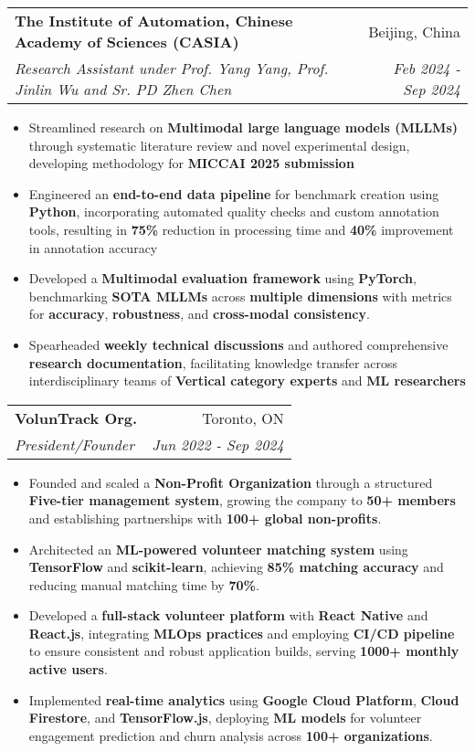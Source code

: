 \documentclass[letterpaper,10pt]{article}
\makeatletter
\newcommand{\resumeItem}[1]{
  \item\small{
    {#1 \vspace{-5pt}}
  }
}
\newcommand{\resumeSubheading}[4]{
  \vspace{-2pt}\item
    \begin{tabular*}{0.97\textwidth}[t]{l@{\extracolsep{\fill}}r}
      \textbf{#1} & #2 \\
      \textit{\small#3} & \textit{\small #4} \\
    \end{tabular*}\vspace{-7pt}
}
\newcommand{\resumeItemListStart}{\begin{itemize}}
\newcommand{\resumeItemListEnd}{\end{itemize}\vspace{-5pt}}
\makeatother
\begin{document}
\resumeSubheading
{The Institute of Automation, Chinese Academy of Sciences (CASIA)}{Beijing, China}
{Research Assistant under Prof. Yang Yang, Prof. Jinlin Wu and Sr. PD Zhen Chen}{Feb 2024 - Sep 2024}
\resumeItemListStart
\resumeItem{Streamlined research on \textbf{Multimodal large language models (MLLMs)} through systematic literature review and novel experimental design, developing methodology for \textbf{MICCAI 2025 submission}}
\resumeItem{Engineered an \textbf{end-to-end data pipeline} for benchmark creation using \textbf{Python}, incorporating automated quality checks and custom annotation tools, resulting in \textbf{75\%} reduction in processing time and \textbf{40\%} improvement in annotation accuracy}
\resumeItem{Developed a \textbf{Multimodal evaluation framework} using \textbf{PyTorch}, benchmarking \textbf{SOTA MLLMs} across \textbf{multiple dimensions} with metrics for \textbf{accuracy}, \textbf{robustness}, and \textbf{cross-modal consistency}.}
\resumeItem{Spearheaded \textbf{weekly technical discussions} and authored comprehensive \textbf{research documentation}, facilitating knowledge transfer across interdisciplinary teams of \textbf{Vertical category experts} and \textbf{ML researchers}}
\resumeItemListEnd

\resumeSubheading
{VolunTrack Org.}{Toronto, ON}
{President/Founder}{Jun 2022 - Sep 2024}
\resumeItemListStart
\resumeItem{Founded and scaled a \textbf{Non-Profit Organization} through a structured \textbf{Five-tier management system}, growing the company to \textbf{50+ members} and establishing partnerships with \textbf{100+ global non-profits}.}
\resumeItem{Architected an \textbf{ML-powered volunteer matching system} using \textbf{TensorFlow} and \textbf{scikit-learn}, achieving \textbf{85\% matching accuracy} and reducing manual matching time by \textbf{70\%}.}
\resumeItem{Developed a \textbf{full-stack volunteer platform} with \textbf{React Native} and \textbf{React.js}, integrating \textbf{MLOps practices} and employing \textbf{CI/CD pipeline} to ensure consistent and robust application builds, serving \textbf{1000+ monthly active users}.}
\resumeItem{Implemented \textbf{real-time analytics} using \textbf{Google Cloud Platform}, \textbf{Cloud Firestore}, and \textbf{TensorFlow.js}, deploying \textbf{ML models} for volunteer engagement prediction and churn analysis across \textbf{100+ organizations}.}
\resumeItemListEnd
\end{document}
